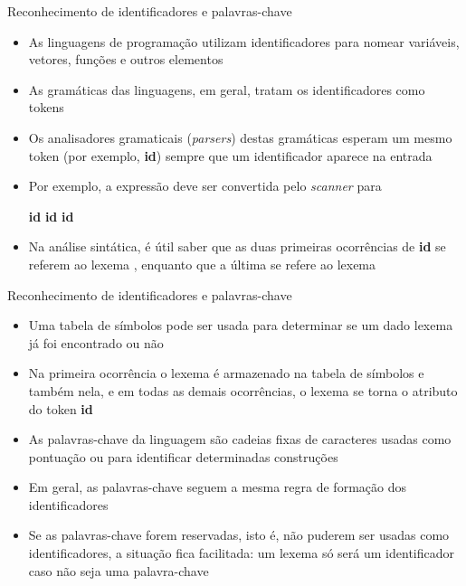 \begin{frame}[fragile]{Reconhecimento de identificadores e palavras-chave}

    \begin{itemize}
        \item As linguagens de programação utilizam identificadores para nomear variáveis, vetores, funções e outros elementos
        \pause

        \item As gramáticas das linguagens, em geral, tratam os identificadores como tokens
        \pause

        \item Os analisadores gramaticais (\textit{parsers}) destas gramáticas esperam um mesmo token (por exemplo, \textbf{id}) sempre que um identificador
            aparece na entrada
        \pause

        \item Por exemplo, a expressão  deve ser convertida pelo \textit{scanner} para 
        \begin{center}
            \textbf{id}  \textbf{id}  \textbf{id}
        \end{center}
        \pause

        \item Na análise sintática, é útil saber que as duas primeiras ocorrências de \textbf{id} se referem ao lexema , enquanto que a última
            se refere ao lexema 
    \end{itemize}

\end{frame}

\begin{frame}[fragile]{Reconhecimento de identificadores e palavras-chave}

    \begin{itemize}
        \item Uma tabela de símbolos pode ser usada para determinar se um dado lexema já foi encontrado ou não
        \pause

        \item Na primeira ocorrência o lexema é armazenado na tabela de símbolos e também nela, e em todas as demais ocorrências, o lexema se torna o atributo
            do token \textbf{id}
        \pause

        \item As palavras-chave da linguagem são cadeias fixas de caracteres usadas como pontuação ou para identificar determinadas construções
        \pause

        \item Em geral, as palavras-chave seguem a mesma regra de formação dos identificadores
        \pause

        \item Se as palavras-chave forem reservadas, isto é, não puderem ser usadas como identificadores, a situação fica facilitada: um lexema só será um
            identificador caso não seja uma palavra-chave
    \end{itemize}

\end{frame}

